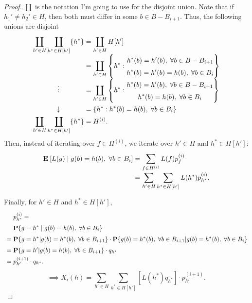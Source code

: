 \begin{proof}
$\coprod$ is the notation I'm going to use for the disjoint union. Note that if $h_1'\neq h_2' \in H$, then both must differ in some $b \in B- B_{i+1}$. Thus, the following unions are disjoint
\[\everymath{\displaystyle}\arraycolsep=1.4pt\def\arraystretch{1.5}
    \begin{array}{rcl}
    \coprod_{h' \in H} \coprod_{h^* \in H[h']}\{h^*\} & = & \coprod_{h' \in H} H[h']\\
    & = & \coprod_{h' \in H} \left\{ h^*: \begin{matrix}
        h^*(b) = h'(b),\; \forall b\in B-B_{i+1}\\
        h^*(b) = h'(b) = h(b) ,\; \forall b\in B_{i}
    \end{matrix} \right\}\\
   \hfill\vdots\hfill & = & \coprod_{h' \in H} \left\{ h^*: \begin{matrix}
        h^*(b) = h'(b),\; \forall b\in B-B_{i+1}\\
        h^*(b) = h(b) ,\; \forall b\in B_{i}
    \end{matrix} \right\}\\
    \hfill\downarrow\hfill& = & \{h^*: h^*(b) = h(b) ,\; \forall b\in B_{i} \}\\
    \coprod_{h' \in H} \coprod_{h^* \in H[h']}\{h^*\} & = & H^{(i)}.
\end{array} \] 
Then, instead of iterating over $f \in H^{(i)}$, we iterate over $h' \in H$ and $h^* \in H[h']$:
\[\everymath{\displaystyle}\arraycolsep=1.4pt\def\arraystretch{1.5} 
\begin{array}{lcl}
    \E[L(g) \;|\; g(b) = h(b),\; \forall b\in B_{i}] & = & \sum_{f\in H^{(i)}} L(f) p_{f}^{(i)}\\
    & = &  \sum_{h' \in H}\sum_{h^* \in H[h']} L(h^*) p^{(i)}_{h^*}.
\end{array}\] 

Finally, for $h' \in H$ and $h^* \in H[h']$,
\[ \everymath{\displaystyle}\arraycolsep=1.4pt\def\arraystretch{1.5} 
\begin{array}{lll}
    & & p^{(i)}_{h^*} = \\
    & & \P\{g = h^* \;|\; g(b) = h(b),\; \forall b\in B_i\}\\
    & = & \P\{g = h^* | g(b) = h^*(b),\; \forall b\in B_{i+1} \} \cdot \P\{g(b) = h^*(b),\;\forall b\in B_{i+1} | g(b) = h^*(b),\; \forall b\in B_{i} \}\\
    & = & \P\{g = h' | g(b) = h(b),\; \forall b\in B_{i+1} \} \cdot q_{h^*}\\
    & = & p_{h'}^{(i+1)}\cdot q_{h^*}.
\end{array}  \] 
\[ \implies X_i(h) = \sum_{h' \in H}\sum_{h^* \in H[h']} [L(h^*) q_{h^*}] \cdot p_{h'}^{(i+1)}. \] 


\end{proof}
